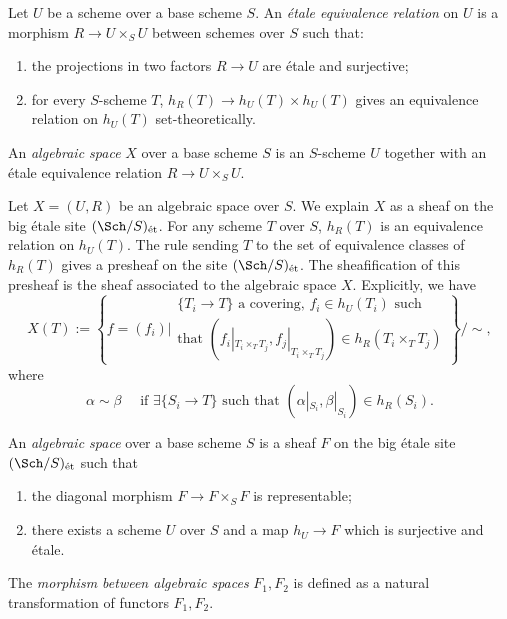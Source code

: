 \begin{definition}\label{def:etale_equivalent_relation}
        Let \(U\) be a scheme over a base scheme \(S\).
        An \emph{\'etale equivalence relation} on \(U\) is a morphism \(R \to U \times_S U\) between schemes over \(S\) such that:
        \begin{enumerate}
            \item the projections in two factors \(R \to U\) are \'etale and surjective;
            \item for every \(S\)-scheme \(T\), \(h_R(T) \to h_U(T) \times h_U(T)\) gives an equivalence relation on \(h_U(T)\) set-theoretically.
        \end{enumerate}
    \end{definition}

    \begin{definition}\label{def:algebraic_space_as_topological_space}
        An \emph{algebraic space} \(X\) over a base scheme \(S\) is an \(S\)-scheme \(U\) together with an \'etale equivalence relation \(R \to U \times_S U\).
    \end{definition}

    Let \(X = (U,R)\) be an algebraic space over \(S\).
    We explain \(X\) as a sheaf on the big \'etale site \((\Sch/S)_{\text{\'et}}\).
    For any scheme \(T\) over \(S\), \(h_R(T)\) is an equivalence relation on \(h_U(T)\).
    The rule sending \(T\) to the set of equivalence classes of \(h_R(T)\) gives a presheaf on the site \((\Sch/S)_{\text{\'et}}\).
    The sheafification of this presheaf is the sheaf associated to the algebraic space \(X\).
    Explicitly, we have
    \[ X(T) := \left\{ f = (f_i) \Bigg| \begin{array}{c}
        \{T_i\to T\} \text{ a covering, } f_i \in h_U(T_i) \text{ such}  \\
        \text{that } (f_i|_{T_i\times_T T_j},f_j|_{T_i\times_T T_j}) \in h_R(T_i \times_T T_j)
    \end{array}     \right\}\Bigg/ \sim, \]
    where 
    \[ \alpha \sim \beta \quad \text{ if } \exists \{S_i \to T\} \text{ such that } (\alpha|_{S_i},\beta|_{S_i}) \in h_R(S_i). \]

    \begin{definition}\label{def:algebraic_space_as_sheaf}
        An \emph{algebraic space} over a base scheme \(S\) is a sheaf \(F\) on the big \'etale site \((\Sch/S)_{\text{\'et}}\) such that 
        \begin{enumerate}
            \item the diagonal morphism \(F \to F \times_S F\) is representable;
            \item there exists a scheme \(U\) over \(S\) and a map \(h_U \to F\) which is surjective and \'etale.
        \end{enumerate}
        The \emph{morphism between algebraic spaces} \(F_1,F_2\) is defined as a natural transformation of functors \(F_1, F_2\).
    \end{definition}

